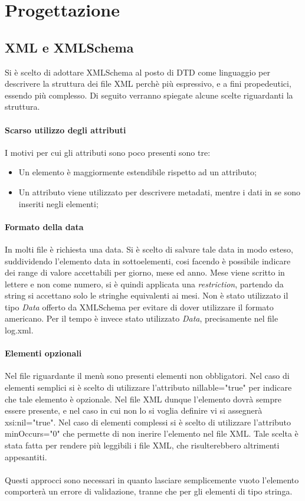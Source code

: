 \section{Progettazione}
\subsection{XML e XMLSchema}
Si è scelto di adottare XMLSchema al posto di DTD come linguaggio per descrivere la struttura dei file XML perchè più espressivo, e a fini propedeutici, essendo più complesso. Di seguito verranno spiegate alcune scelte riguardanti la struttura.

\paragraph{Scarso utilizzo degli attributi}

I motivi per cui gli attributi sono poco presenti sono tre:
\begin{itemize}
\item Un elemento è maggiormente estendibile rispetto ad un attributo;
\item Un attributo viene utilizzato per descrivere metadati, mentre i dati in se sono inseriti negli elementi;
\end{itemize}

\paragraph{Formato della data}
In molti file è richiesta una data. Si è scelto di salvare tale data in modo esteso, suddividendo l'elemento data in sottoelementi, cosi facendo è possibile indicare dei range di valore accettabili per giorno, mese ed anno. 
Mese viene scritto in lettere e non come numero, si è quindi applicata una \emph{restriction}, partendo da string si accettano solo le stringhe equivalenti ai mesi.
Non è stato utilizzato il tipo \emph{Data} offerto da XMLSchema per evitare di dover utilizzare il formato americano.
Per il tempo è invece stato utilizzato \emph{Data}, precisamente nel file log.xml.

\paragraph{Elementi opzionali}
Nel file riguardante il menù sono presenti elementi non obbligatori. Nel caso di elementi semplici si è scelto di utilizzare l'attributo nillable="true" per indicare che tale elemento è opzionale. Nel file XML dunque l'elemento dovrà sempre essere presente, e nel caso in cui non lo si voglia definire vi si assegnerà xsi:nil="true".  
Nel caso di elementi complessi si è scelto di utilizzare l'attributo minOccurs="0" che permette di non inerire l'elemento nel file XML. Tale scelta è stata fatta per rendere più leggibili i file XML, che risulterebbero altrimenti appesantiti.\\ \\
Questi approcci sono necessari in quanto lasciare semplicemente vuoto l'elemento comporterà un errore di validazione, tranne che per gli elementi di tipo stringa.

